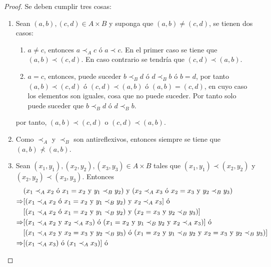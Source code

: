 \documentclass[12pt]{report}
\theoremstyle{largebreak}
\begin{document}
    \begin{proof}
        Se deben cumplir tres cosas:
        \begin{enumerate}
            \item Sean $(a,b),(c,d)\in A\times B$ y suponga que $(a,b)\neq(c,d)$, se tienen dos casos:
            \begin{enumerate}
                \item $a\neq c$, entonces $a\prec_A c$ ó $a\prec c$. En el primer caso se tiene que $(a,b)\prec(c,d)$. En caso contrario se tendría que $(c,d)\prec(a,b)$.
                \item $a=c$, entonces, puede suceder $b\prec_B d$ ó $d\prec_B b$ ó $b=d$, por tanto $(a,b)\prec(c,d)$ ó $(c,d)\prec(a,b)$ ó $(a,b)=(c,d)$, en cuyo caso los elementos son iguales, cosa que no puede suceder. Por tanto solo puede suceder que $b\prec_B d$ ó $d\prec_B b$.
            \end{enumerate}
            por tanto, $(a,b)\prec(c,d)$ o $(c,d)\prec(a,b)$.
            \item Como $\prec_A$ y $\prec_B$ son antireflexivos, entonces siempre se tiene que $(a,b)\nprec (a,b)$.
            \item Sean $(x_1,y_1),(x_2,y_2),(x_3,y_3)\in A\times B$ tales que $(x_1,y_1)\prec(x_2,y_2)$ y $(x_2,y_2)\prec(x_3,y_3)$. Entonces
            \begin{equation*}
                \begin{split}
                    &(x_1\prec_A x_2 \textup{ ó } x_1=x_2 \textup{ y } y_1\prec_B y_2)\textup{ y }(x_2\prec_A x_3 \textup{ ó } x_2=x_3 \textup{ y } y_2\prec_B y_3)\\
                    \Rightarrow &[(x_1\prec_A x_2 \textup{ ó } x_1=x_2 \textup{ y } y_1\prec_B y_2)\textup{ y }x_2\prec_A x_3]\textup{ ó }\\
                    &[(x_1\prec_A x_2 \textup{ ó } x_1=x_2 \textup{ y } y_1\prec_B y_2)\textup{ y }(x_2=x_3 \textup{ y } y_2\prec_B y_3)]\\
                    \Rightarrow &[(x_1\prec_A x_2\textup{ y }x_2\prec_A x_3)\textup{ ó }(x_1=x_2 \textup{ y } y_1\prec_B y_2\textup{ y }x_2\prec_A x_3)]\textup{ ó }\\
                    &[(x_1\prec_A x_2\textup{ y }x_2=x_3 \textup{ y } y_2\prec_B y_3)\textup{ ó }(x_1=x_2 \textup{ y } y_1\prec_B y_2\textup{ y }x_2=x_3 \textup{ y } y_2\prec_B y_3)]\\
                    \Rightarrow &[(x_1\prec_A x_3)\textup{ ó }(x_1\prec_A x_3)]\textup{ ó }\\

\end{split}
\end{equation*}
\end{enumerate}
\end{proof}
\end{document}
